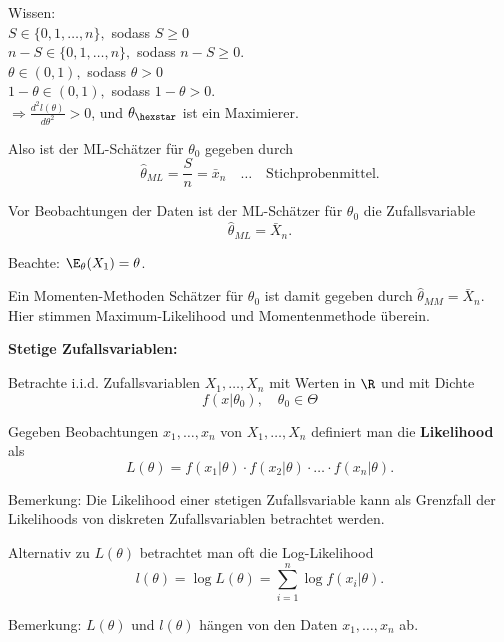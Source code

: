 \documentclass{tstextbook}
\begin{document}
\begin{example}
	Wissen: \\
	
	$ S\in\lbrace0,1,\ldots,n\rbrace, $ sodass $ S \ge 0 $ \\
	
	$ n-S\in\lbrace0,1,\ldots,n\rbrace, $ sodass $ n-S \ge 0 $.\\
	
	$ \theta\in(0,1), $ sodass $ \theta > 0 $ \\
	
	$ 1-\theta\in(0,1), $ sodass $ 1-\theta > 0 $. \\
	
	$ \Rightarrow \frac{d^2l(\theta)}{d\theta^2} > 0 $, und $ \theta_{\hexstar} $ ist ein Maximierer.
	
	Also ist der ML-Schätzer für $ \theta_0 $ gegeben durch 
	\[
	\hat{\theta}_{ML} = \frac{S}{n} = \bar{x}_n \quad \ldots \quad \text{Stichprobenmittel}.
	\]
	
	Vor Beobachtungen der Daten ist der ML-Schätzer für $ \theta_0 $ die Zufallsvariable 
	\[
	\hat{\theta}_{ML} = \bar{X}_n.
	\]
	
	Beachte: $ \E_{\theta}(X_1)=\theta $. 
	
	Ein Momenten-Methoden Schätzer für $ \theta_0 $ ist damit gegeben durch $ \hat{\theta}_{MM} = \bar{X}_n $. Hier stimmen Maximum-Likelihood und Momentenmethode überein.
\end{example}


\textbf{Stetige Zufallsvariablen:}

Betrachte i.i.d. Zufallsvariablen $ X_1,\ldots,X_n $ mit Werten in $ \R $ und mit Dichte 
\[
f(x|\theta_0), \quad \theta_0\in\Theta
\]

Gegeben Beobachtungen $ x_1,\ldots,x_n $ von $ X_1,\ldots,X_n $ definiert man die \textbf{Likelihood} als 
\[
L(\theta) = f(x_1|\theta)\cdot f(x_2|\theta)\cdot\ldots\cdot f(x_n|\theta).
\]

\begin{remark}
	Bemerkung: Die Likelihood einer stetigen Zufallsvariable kann als Grenzfall der Likelihoods von diskreten Zufallsvariablen betrachtet werden. 
\end{remark}

Alternativ zu $ L(\theta) $ betrachtet man oft die Log-Likelihood 
\[
l(\theta) = \log L(\theta) = \sum_{i=1}^{n} \log f(x_i|\theta).
\]

\begin{remark}
	Bemerkung: $ L(\theta) $ und $ l(\theta) $ hängen von den Daten $ x_1,\ldots,x_n $ ab.
\end{remark}
\end{document}
